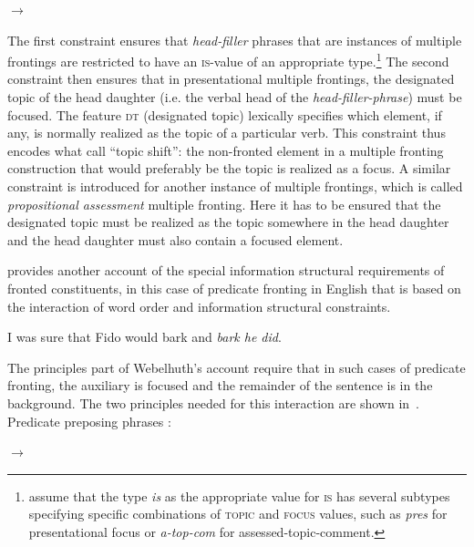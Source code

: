 \documentclass[output=paper]{langsci/langscibook}
\begin{document}
\bigskip
    \begin{avm}
    \end{avm}
$\to$\ 
  \begin{avm}
  \end{avm}
  \label{fig:multiplefronting}
\z
The first constraint ensures that \textit{head-filler} phrases that
are instances of multiple frontings are restricted to have an
\textsc{is}-value of an appropriate type.\footnote{\cite[75]{BC2010a}
  assume that the type \textit{is} as the appropriate value for
  \textsc{is} has several subtypes specifying specific combinations of
  \textsc{topic} and \textsc{focus} values, such as \textit{pres} for
  presentational focus or \textit{a-top-com} for
  assessed-topic-comment.} The second constraint then ensures that in
presentational multiple frontings, the designated topic of the head
daughter (i.e. the verbal head of the \textit{head-filler-phrase})
must be focused. The feature \textsc{dt} (designated topic) lexically specifies which
element, if any, is normally realized as the topic of a particular
verb. This constraint thus encodes what \cite{BC2010a} call ``topic
shift'': the non-fronted element in a multiple fronting construction
that would preferably be the topic is realized as a focus. A similar
constraint is introduced for another instance of multiple frontings,
which is called \textit{propositional assessment} multiple
fronting. Here it has to be ensured that the designated topic must be
realized as the topic somewhere in the head daughter and the
head daughter must also contain a focused element.

\cite{Webelhuth2007a-u} provides another account of the special
information structural requirements of fronted constituents, in this
case of predicate fronting in English that is based on the interaction
of word order and information structural constraints.
\begin{exe}
  \ex I was sure that Fido would bark and \textit{bark he did}.
\end{exe}

The principles part of Webelhuth's account require that in such cases
of predicate fronting, the auxiliary is focused and the remainder of
the sentence is in the background. The two
principles needed for this interaction are shown in~.
\ea
Predicate preposing phrases \citep{Webelhuth2007a-u}:\\
  \centering
  \begin{avm}
  \end{avm}
$\to$\ 
\begin{avm}
\end{avm}
\end{document}
